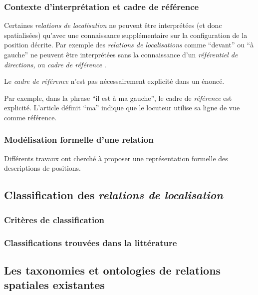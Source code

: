 \subsubsection{Contexte d'interprétation et cadre de référence}

Certaines \emph{relations de localisation} ne peuvent être
interprétées (et donc spatialisées) qu'avec une connaissance
supplémentaire sur la configuration de la position décrite. Par
exemple des \emph{relations de localisations} comme \enquote{devant}
ou \enquote{à gauche} ne peuvent être interprétées sans la
connaissance d'un \emph{référentiel de directions,} ou \emph{cadre de
  référence} \autocite{Duchene2019}.

Le \emph{cadre de référence} n'est pas nécessairement explicité dans
un énoncé.

Par exemple, dans la phrase \enquote{il est à ma gauche}, le cadre de
\emph{référence} est explicité. L'article définit \enquote{ma} indique
que le locuteur utilise sa ligne de vue comme référence.

\subsubsection{Modélisation formelle d'une relation}

Différents travaux ont cherché à proposer une représentation formelle
des descriptions de positions.

\autocite{Bateman2010}

\autocite{Pustejovsky2017}

\subsection{Classification des \emph{relations de localisation}}

\subsubsection{Critères de classification}

\subsubsection{Classifications trouvées dans la littérature}

\subsection{Les taxonomies et ontologies de relations spatiales
  existantes}

